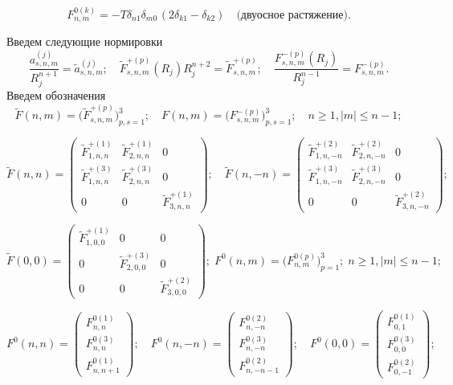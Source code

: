 \begin{equation}
F_{n,m}^{0(k)} =  - T{\delta _{n1}}{\delta _{m0\,}}(2{\delta _{k1}} - {\delta _{k2}})\quad\text{(двуосное растяжение)}.
\label{eq:8:20}
\end{equation}

Введем следующие нормировки
$$
\frac{a_{s,n,m}^{(j)}}{R_j^{n+1}}=\tilde a_{s,n,m}^{(j)};\quad\tilde F_{s,n,m}^{+(p)}(R_j)R_j^{n+2}=\tilde F_{s,n,m}^{+(p)};\quad\frac{F_{s,n,m}^{-(p)}(R_j)}{R_j^{n-1}}=F_{s,n,m}^{-(p)}.
$$
Введем обозначения
$$
\tilde F(n,m)=\bigg(\tilde F_{s,n,m}^{+(p)}\bigg)_{p,s=1}^3;\quad
F(n,m)=\bigg(F_{s,n,m}^{-(p)}\bigg)_{p,s=1}^3;\quad n\ge 1, |m|\le n-1;
$$

\begin{equation*}
\tilde F(n,n)=
\begin{pmatrix}
\tilde F_{1,n,n}^{+(1)} & \tilde F_{2,n,n}^{+(1)} & 0 \\
\tilde F_{1,n,n}^{+(3)} & \tilde F_{2,n,n}^{+(3)} & 0 \\
0 & 0 & \tilde F_{3,n,n}^{+(1)}
\end{pmatrix};\quad
\tilde F(n,-n)=
\begin{pmatrix}
\tilde F_{1,n,-n}^{+(2)} & \tilde F_{2,n,-n}^{+(2)} & 0 \\
\tilde F_{1,n,-n}^{+(3)} & \tilde F_{2,n,-n}^{+(3)} & 0 \\
0 & 0 & \tilde F_{3,n,-n}^{+(2)}
\end{pmatrix};
\end{equation*}

\begin{equation*}
\tilde F(0,0)=
\begin{pmatrix}
\tilde F_{1,0,0}^{+(1)} & 0 & 0 \\
0 & \tilde F_{2,0,0}^{+(3)} & 0 \\
0 & 0 & \tilde F_{3,0,0}^{+(2)}
\end{pmatrix};\;
F^0(n,m)=\bigg(F_{n,m}^{0(p)}\bigg)_{p=1}^3;\; n\ge 1, |m|\le n-1;
\end{equation*}

\begin{equation*}
F^0(n,n)=
\begin{pmatrix}
F_{n,n}^{0(1)} \\
F_{n,n}^{0(3)} \\
F_{n,n+1}^{0(1)}
\end{pmatrix};\quad
F^0(n,-n)=
\begin{pmatrix}
F_{n,-n}^{0(2)} \\
F_{n,-n}^{0(3)} \\
F_{n,-n-1}^{0(2)}
\end{pmatrix};\quad
F^0(0,0)=
\begin{pmatrix}
F_{0,1}^{0(1)} \\
F_{0,0}^{0(3)} \\
F_{0,-1}^{0(2)}
\end{pmatrix};
\end{equation*}

